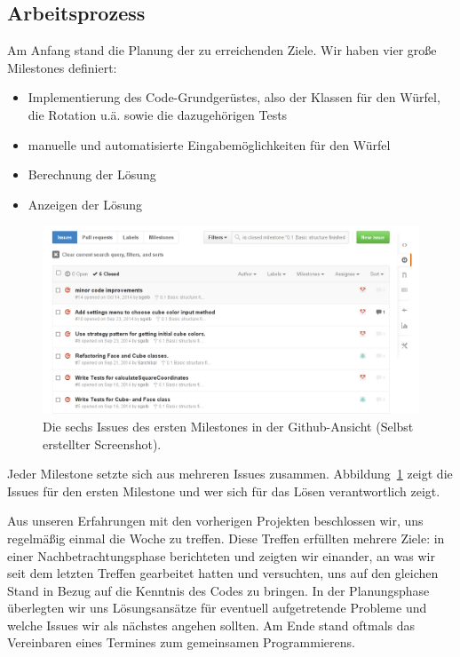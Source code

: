 \subsection{Arbeitsprozess}  %

Am Anfang stand die Planung der zu erreichenden Ziele. Wir haben vier große
Milestones definiert:

\begin{itemize}
  \item Implementierung des Code-Grundgerüstes, also der Klassen für den Würfel,
    die Rotation u.ä. sowie die dazugehörigen Tests
  \item manuelle und automatisierte Eingabemöglichkeiten für den Würfel
  \item Berechnung der Lösung
  \item Anzeigen der Lösung
\end{itemize}

\begin{figure}[ht!]
  \centering
  \includegraphics[width=\textwidth]{pics/github_issues.png}
  \caption{Die sechs Issues des ersten Milestones in der Github-Ansicht
  (Selbst erstellter Screenshot).}
  \label{fig:github_issues}
\end{figure}

Jeder Milestone setzte sich aus mehreren Issues zusammen.
Abbildung~\ref{fig:github_issues} zeigt die Issues für den ersten Milestone und
wer sich für das Lösen verantwortlich zeigt.

Aus unseren Erfahrungen mit den vorherigen Projekten beschlossen wir, uns
regelmäßig einmal die Woche zu treffen. Diese Treffen erfüllten mehrere Ziele:
in einer Nachbetrachtungsphase berichteten und zeigten wir einander, an was wir
seit dem letzten Treffen gearbeitet hatten und versuchten, uns auf den gleichen
Stand in Bezug auf die Kenntnis des Codes zu bringen. In der Planungsphase
überlegten wir uns Lösungsansätze für eventuell aufgetretende Probleme und
welche Issues wir als nächstes angehen sollten. Am Ende stand oftmals das
Vereinbaren eines Termines zum gemeinsamen Programmierens.


